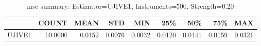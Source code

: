 \begin{table}[ht]
\centering
\caption{mse summary: Estimator=UJIVE1, Instruments=500, Strength=0.20}
\begin{tabular}{lrrrrrrrr}
\toprule
 & COUNT & MEAN & STD & MIN & 25\% & 50\% & 75\% & MAX \\
\midrule
UJIVE1 & 10.0000 & 0.0152 & 0.0076 & 0.0032 & 0.0120 & 0.0141 & 0.0159 & 0.0321 \\
\bottomrule
\end{tabular}
\end{table}
